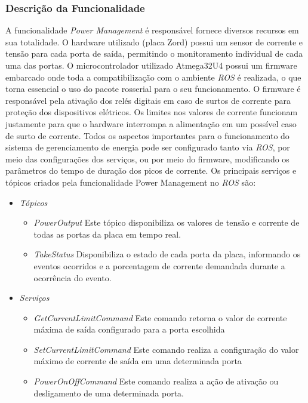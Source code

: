 \subsubsection{Descrição da Funcionalidade}
A funcionalidade \textit{Power Management} é responsável  fornece diversos recursos em sua totalidade. O hardware utilizado (placa Zord) possui um sensor de corrente e tensão para cada porta de saída, permitindo o monitoramento individual de cada uma das portas. O microcontrolador utilizado Atmega32U4 possui um firmware embarcado onde toda a compatibilização com o ambiente \textit{ROS} é realizada, o que torna essencial o uso do pacote rosserial para o seu funcionamento. O firmware é responsável pela ativação dos relés digitais em caso de surtos de corrente para proteção dos dispositivos elétricos. 
Os limites nos valores de corrente funcionam justamente para que o hardware interrompa a alimentação em um possível caso de surto de corrente. Todos os aspectos importantes para o funcionamento do sistema de gerenciamento de energia pode ser configurado tanto via \textit{ROS}, por meio das configurações dos serviços, ou por meio do firmware, modificando os parâmetros do tempo de duração dos picos de corrente. Os principais serviços e tópicos criados pela funcionalidade Power Management no \textit{ROS} são:
\begin{itemize}
	\item \textit{Tópicos}
	\begin{itemize}
		\item \textit{PowerOutput}
		Este tópico disponibiliza os valores de tensão e corrente de todas as portas da placa em tempo real.
		\item \textit{TakeStatus}
		Disponibiliza o estado de cada porta da placa, informando os eventos ocorridos e a porcentagem de corrente demandada durante a ocorrência do evento.
	\end{itemize} 
	\item \textit{Serviços} 
	\begin{itemize}
	\item \textit{GetCurrentLimitCommand}
	Este comando retorna o valor de corrente máxima de saída configurado para a porta escolhida
	\item \textit{SetCurrentLimitCommand}
	Este comando realiza a configuração do valor máximo de corrente de saída em uma determinada porta
	\item \textit{PowerOnOffCommand}
	Este comando realiza a ação de ativação ou desligamento de uma determinada porta.
	\end{itemize}
\end{itemize}

